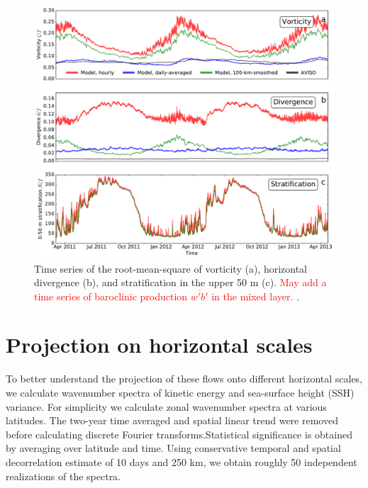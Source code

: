 \documentclass[grl]{agutex2015}
\begin{document}
\begin{article}
 \begin{figure}[ht]
   \begin{center}
     \includegraphics[width=.9\textwidth]{figs/fig2.pdf}
  \caption{Time series of the root-mean-square of vorticity (a),
  horizontal divergence (b), and stratification in the upper 50 m (c).
  \textcolor{red}{May add a time series of baroclinic production $\overline{w'b'}$ in
  the mixed layer. }.}
  \label{fig2}
  \end{center}
\end{figure}

\section{Projection on horizontal scales}

To better understand the projection of these flows onto different horizontal
scales, we calculate wavenumber spectra of kinetic energy and sea-surface height
(SSH) variance. For simplicity we calculate zonal wavenumber spectra at various
latitudes. The two-year time averaged and spatial linear trend were
removed before calculating discrete Fourier transforms.Statistical significance
is obtained by averaging over latitude and time. Using conservative temporal and
spatial decorrelation estimate of 10 days and 250 km, we obtain roughly 50
independent realizations of the spectra.


\end{article}
\end{document}
